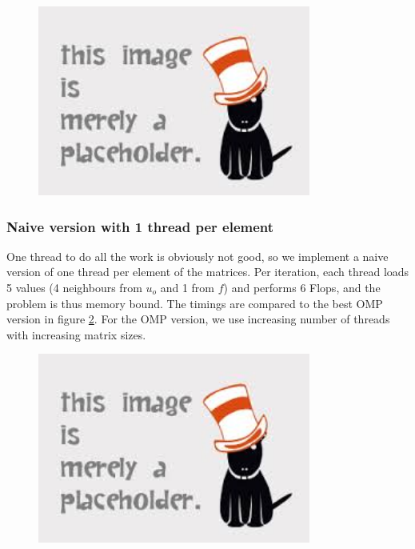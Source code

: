 \begin{figure}
\centering
\includegraphics[width = 0.8\textwidth]{fig/placeholder.jpg}
\caption{}
\label{fig:poisson_seq}
\end{figure}



\subsubsection{Naive version with 1 thread per element}
One thread to do all the work is obviously not good, so we implement a naive version of one thread per element of the matrices. Per iteration, each thread loads 5 values (4 neighbours from $u_o$ and 1 from $f$) and performs 6 Flops, and the problem is thus memory bound. The timings are compared to the best OMP version in figure \ref{fig:poisson_sin}. For the OMP version, we use increasing number of threads with increasing matrix sizes.

\begin{figure}
\centering
\includegraphics[width = 0.8\textwidth]{fig/placeholder.jpg}
\caption{}
\label{fig:poisson_sin}
\end{figure}

